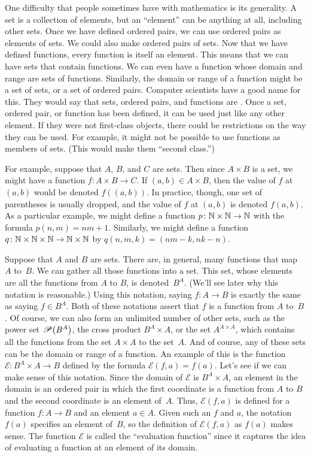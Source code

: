 One difficulty that people sometimes have with mathematics
is its generality.  A set is a collection of elements, but
an ``element'' can be anything at all, including other sets.
Once we have defined ordered pairs, we can use ordered pairs as elements
of sets.  We could also make ordered pairs of sets.
Now that we have defined functions, every function is itself
an element.  This means that we can have sets that contain
functions.  We can even have a function whose domain and
range are sets of functions.  Similarly, the domain or
range of a function might be a set of sets, or a set of
ordered pairs.  Computer scientists
have a good name for this.  They would say that sets, ordered pairs, and
functions are .  Once a set, ordered pair, or function
has been defined, it can be used just like any other element.
If they were not first-class objects, there could be restrictions
on the way they can be used.  For example, it might not be
possible to use functions as members of sets. (This would make them
``second class.'')

For example, suppose that $A$, $B$, and $C$ are sets.  Then
since $A\times B$ is a set, we might have a function
$f\colon A\times B\to C$.  If $(a,b)\in A\times B$, then
the value of $f$ at $(a,b)$ would be denoted $f((a,b))$.
In practice, though, one set of parentheses is usually dropped,
and the value of $f$ at $(a,b)$ is denoted $f(a,b)$.
As a particular example, we might define a function
$p\colon {\mathbb N}\times{\mathbb N}\to{\mathbb N}$ with the formula $p(n,m)=nm+1$.
Similarly, we might define a function
$q\colon {\mathbb N}\times{\mathbb N}\times{\mathbb N}\to{\mathbb N}\times{\mathbb N}$ by
$q(n,m,k)=(nm-k,nk-n)$.

Suppose that $A$ and $B$ are sets.  There are, in general, many
functions that map $A$ to~$B$.  We can gather all those functions
into a set.  This set, whose elements are
all the functions from $A$ to $B$, is denoted~$B^A$.
(We'll see later why this notation is reasonable.)  Using this notation,
saying $f\colon A\to B$ is exactly the same as saying
$f\in B^A$.  Both of these notations assert that $f$ is a function
from $A$ to~$B$.  Of course, we can also form an unlimited number
of other sets, such as the power set ${\mathscr P}\big(B^A\big)$,
the cross product $B^A\times A$, or the set $A^{A\times A}$,
which contains all the functions from the set $A\times A$
to the set~$A$.  And of course, any of these sets can be
the domain or range of a function.  An example of this
is the function ${\mathscr E}\colon B^A\times A\to B$ defined
by the formula ${\mathscr E}(f,a) = f(a)$.  Let's see if
we can make sense of this notation.  Since the domain of
${\mathscr E}$ is $B^A\times A$, an element in the domain
is an ordered pair in which the first coordinate is a function
from $A$ to $B$ and the second coordinate is an element of~$A$.
Thus, ${\mathscr E}(f,a)$ is defined for a function $f\colon A\to B$
and an element $a\in A$.  Given such an $f$ and $a$, the notation
$f(a)$ specifies an element of~$B$, so the definition of
${\mathscr E}(f,a)$ as $f(a)$ makes sense.  The function ${\mathscr E}$
is called the ``evaluation function'' since it captures the idea
of evaluating a function at an element of its domain.



